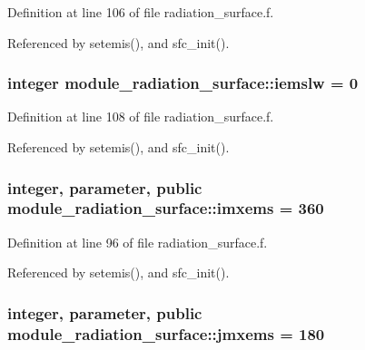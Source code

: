 Definition at line 106 of file radiation\+\_\+surface.\+f.



Referenced by setemis(), and sfc\+\_\+init().

\subsubsection[{\texorpdfstring{iemslw}{iemslw}}]{\setlength{\rightskip}{0pt plus 5cm}integer module\+\_\+radiation\+\_\+surface\+::iemslw = 0\hspace{0.3cm}{\ttfamily [private]}}\hypertarget{namespacemodule__radiation__surface_a3ceebb99dbffcb70a14cfcaa7b029abc}{}\label{namespacemodule__radiation__surface_a3ceebb99dbffcb70a14cfcaa7b029abc}


Definition at line 108 of file radiation\+\_\+surface.\+f.



Referenced by setemis(), and sfc\+\_\+init().

\subsubsection[{\texorpdfstring{imxems}{imxems}}]{\setlength{\rightskip}{0pt plus 5cm}integer, parameter, public module\+\_\+radiation\+\_\+surface\+::imxems = 360}\hypertarget{namespacemodule__radiation__surface_aab4b9853c71ff40f8db2aa78b7cab265}{}\label{namespacemodule__radiation__surface_aab4b9853c71ff40f8db2aa78b7cab265}


Definition at line 96 of file radiation\+\_\+surface.\+f.



Referenced by setemis(), and sfc\+\_\+init().

\subsubsection[{\texorpdfstring{jmxems}{jmxems}}]{\setlength{\rightskip}{0pt plus 5cm}integer, parameter, public module\+\_\+radiation\+\_\+surface\+::jmxems = 180}\hypertarget{namespacemodule__radiation__surface_a3922674f1c727d517ba5b0f7f5093970}{}\label{namespacemodule__radiation__surface_a3922674f1c727d517ba5b0f7f5093970}


